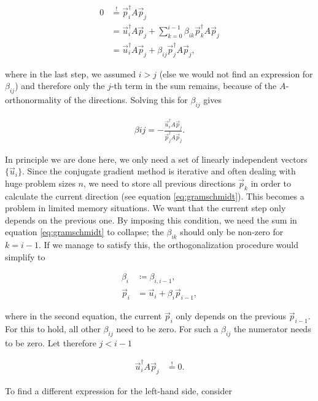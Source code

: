 \documentclass{article}
\theoremstyle{plain} %
\theoremstyle{convention} %
\theoremstyle{remark} %
\numberwithin{equation}{section}
\begin{document}
\begin{align*}
    0 &\stackrel{!}{=} \vec{p}_i^{\dagger} A \vec{p}_j \\
                    &= \vec{u}_i^{\dagger} A \vec{p}_j + \sum_{k=0}^{i-1} \beta_{ik} \vec{p}_k^{\dagger} A \vec{p}_j \\
                    &= \vec{u}_i^{\dagger} A \vec{p}_j + \beta_{ij} \vec{p}_j^{\dagger} A \vec{p}_j,
\end{align*}

where in the last step, we assumed $i>j$ (else we would not find an expression for $\beta_{ij}$) and therefore only the $j$-th term in the sum remains, because of the $A$-orthonormality of the directions. Solving this for $\beta_{ij}$ gives

\begin{align}
    \beta{ij} = - \frac{ \vec{u}_i^{\dagger} A \vec{p}_j }{ \vec{p}_j^{\dagger} A \vec{p}_j }. \label{eq:betas}
\end{align}

In principle we are done here, we only need a set of linearly independent vectors $\{\vec{u}_i\}$. Since the conjugate gradient method is iterative and often dealing with huge problem sizes $n$, we need to store all previous directions $\vec{p}_k$ in order to calculate the current direction (see equation \eqref{eq:gramschmidt}). This becomes a problem in limited memory situations. We want that the current step only depends on the previous one. By imposing this condition, we need the sum in equation \eqref{eq:gramschmidt} to collapse; the $\beta_{ik}$ should only be non-zero for $k=i-1$. If we manage to satisfy this, the orthogonalization procedure would simplify to

\begin{align*}
    \beta_i &\coloneqq \beta_{i, i-1}, \\
    \vec{p}_i &= \vec{u}_i + \beta_i \vec{p}_{i-1},
\end{align*}

where in the second equation, the current $\vec{p}_i$ only depends on the previous $\vec{p}_{i-1}$. For this to hold, all other $\beta_{ij}$ need to be zero. For such a $\beta_{ij}$ the numerator needs to be zero. Let therefore $j<i-1$

\begin{align*}
    \vec{u}_i^{\dagger} A \vec{p}_j &\stackrel{!}{=} 0.
\end{align*}

To find a different expression for the left-hand side, consider
\end{document}
